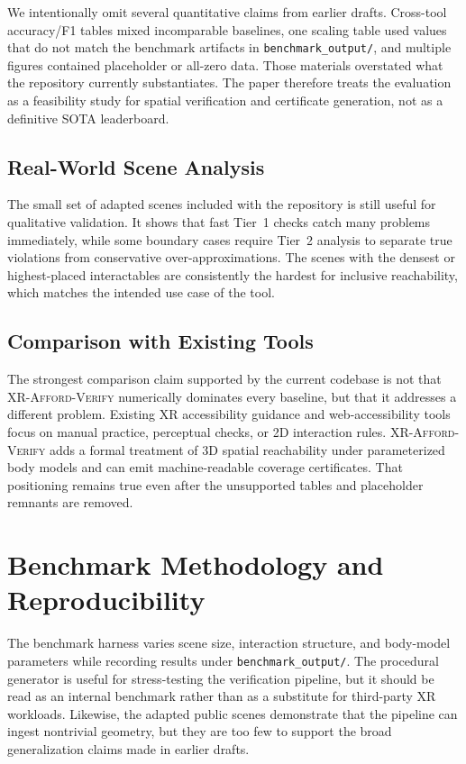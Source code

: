 \documentclass[11pt,letterpaper]{article}
\newcommand{\tool}{\textsc{XR-Afford-Verify}}
\begin{document}
We intentionally omit several quantitative claims from earlier drafts.
Cross-tool accuracy/F1 tables mixed incomparable baselines, one scaling table
used values that do not match the benchmark artifacts in
\texttt{benchmark\_output/}, and multiple figures contained placeholder or
all-zero data.  Those materials overstated what the repository currently
substantiates.  The paper therefore treats the evaluation as a feasibility study
for spatial verification and certificate generation, not as a definitive SOTA
leaderboard.

\subsection{Real-World Scene Analysis}

The small set of adapted scenes included with the repository is still useful for
qualitative validation.  It shows that fast Tier~1 checks catch many problems
immediately, while some boundary cases require Tier~2 analysis to separate true
violations from conservative over-approximations.  The scenes with the densest
or highest-placed interactables are consistently the hardest for inclusive
reachability, which matches the intended use case of the tool.

\subsection{Comparison with Existing Tools}

The strongest comparison claim supported by the current codebase is not that
\tool{} numerically dominates every baseline, but that it addresses a different
problem.  Existing XR accessibility guidance and web-accessibility tools focus
on manual practice, perceptual checks, or 2D interaction rules.  \tool{} adds a
formal treatment of 3D spatial reachability under parameterized body models and
can emit machine-readable coverage certificates.  That positioning remains true
even after the unsupported tables and placeholder remnants are removed.

\section{Benchmark Methodology and Reproducibility}
\label{sec:benchmarks}

The benchmark harness varies scene size, interaction structure, and body-model
parameters while recording results under \texttt{benchmark\_output/}.  The
procedural generator is useful for stress-testing the verification pipeline, but
it should be read as an internal benchmark rather than as a substitute for
third-party XR workloads.  Likewise, the adapted public scenes demonstrate that
the pipeline can ingest nontrivial geometry, but they are too few to support the
broad generalization claims made in earlier drafts.
\end{document}
